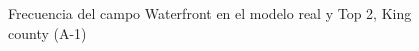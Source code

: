 \begin{figure}[H]
    \centering
    
    \caption{Frecuencia del campo Waterfront en el modelo real y Top 2, King county (A-1)}
    \label{frecuency-top2-waterfront}
\end{figure}